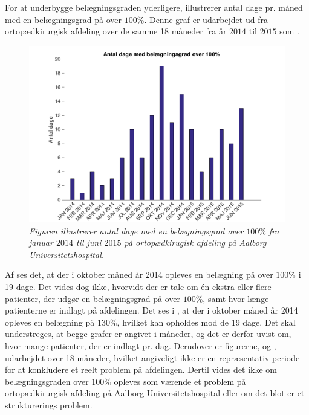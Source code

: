 For at underbygge belægningsgraden yderligere, illustrerer  antal dage pr. måned med en belægningsgrad på over $100 \%$. Denne graf er udarbejdet ud fra ortopædkirurgisk afdeling over de samme 18 måneder fra år $2014$ til $2015$ som . \cite{SDS2015} 

\begin{figure}[H]
	\flushleft 
	\centering
	\includegraphics[scale=.4]{figures/antaldage.png}
	\flushleft
	\caption{\textit{Figuren illustrerer antal dage med en belægningsgrad over $100 \%$ fra januar 			$2014$ til juni $2015$ på ortopædkirugisk afdeling på Aalborg Universitetshospital. 					\cite{SDS2015}}}
	\label{antaldage}
\end{figure}


Af  ses det, at der i oktober måned år 2014 opleves en belægning på over $100 \%$ i 19 dage. Det vides dog ikke, hvorvidt der er tale om én ekstra eller flere patienter, der udgør en belægningsgrad på over $100 \%$, samt hvor længe patienterne er indlagt på afdelingen. Det ses i , at der i oktober måned år 2014 opleves en belægning på $130 \%$, hvilket kan opholdes mod de 19 dage. Det skal understreges, at begge grafer er angivet i måneder, og det er derfor uvist om, hvor mange patienter, der er indlagt pr. dag. Derudover er figurerne,  og , udarbejdet over 18 måneder, hvilket angiveligt ikke er en repræsentativ periode for at konkludere et reelt problem på afdelingen. Dertil vides det ikke om belægningsgraden over $100 \%$ opleves som værende et problem på ortopædkirurgisk afdeling på Aalborg Universitetshospital eller om det blot er et strukturerings problem.  